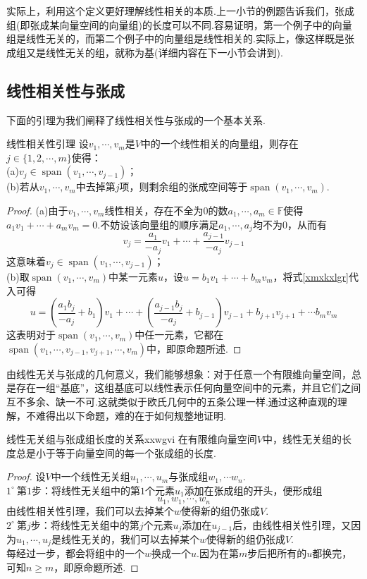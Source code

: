 \documentclass[lang=cn, zihao=5]{elegantbook}
\newcommand{\ssb}[1]{\left( #1 \right)}
\newcommand{\F}{\mathbb{F}}
\newcommand{\buzhou}[1]{$#1^{\circ} \ $}
\DeclareMathOperator{\spn}{span}
\begin{document}
实际上，利用这个定义更好理解线性相关的本质.上一小节的例题告诉我们，张成组(即张成某向量空间的向量组)的长度可以不同.容易证明，第一个例子中的向量组是线性无关的，而第二个例子中的向量组是线性相关的.实际上，像这样既是张成组又是线性无关的组，就称为基(详细内容在下一小节会讲到).


\subsection{线性相关性与张成}

下面的引理为我们阐释了线性相关性与张成的一个基本关系.

\begin{proposition}{线性相关性引理}
	设$v_1, \cdots ,v_m$是$V$中的一个线性相关的向量组，则存在$j \in \{ 1,2, \cdots ,m \}$使得： \\
	(a)$v_j \in \spn (v_1, \cdots , v_{j-1})$； \\
	(b)若从$v_1, \cdots ,v_m$中去掉第$j$项，则剩余组的张成空间等于$\spn (v_1, \cdots ,v_m)$.
\end{proposition}
\begin{proof}
	(a)由于$v_1, \cdots ,v_m$线性相关，存在不全为$0$的数$a_1, \cdots ,a_m \in \F$使得$a_1v_1 + \cdots + a_mv_m = 0$.不妨设该向量组的顺序满足$a_1, \cdots ,a_j$均不为$0$，从而有
	\begin{equation}
		v_j = \frac{a_1}{-a_j} v_1 + \cdots + \frac{a_{j-1}}{-a_j} v_{j-1} \label{xmxkxlgr}
	\end{equation}
	这意味着$v_j \in \spn (v_1, \cdots , v_{j-1})$； \\
	(b)取$\spn (v_1, \cdots ,v_m)$中某一元素$u$，设$u=b_1v_1 + \cdots + b_mv_m$，将式\ref{xmxkxlgr}代入可得
	$$u = \ssb{\frac{a_1b_j}{-a_j}+b_1}v_1 + \cdots + \ssb{\frac{a_{j-1}b_j}{-a_j}+b_{j-1}}v_{j-1} + b_{j+1} v_{j+1} + \cdots b_mv_m$$
	这表明对于$\spn (v_1, \cdots ,v_m)$中任一元素，它都在$\spn (v_1, \cdots ,v_{j-1} , v_{j+1}, \cdots ,v_m)$中，即原命题所述.
\end{proof}

由线性无关与张成的几何意义，我们能够想象：对于任意一个有限维向量空间，总是存在一组“基底”，这组基底可以线性表示任何向量空间中的元素，并且它们之间互不多余、缺一不可.这就类似于欧氏几何中的五条公理一样.通过这种直观的理解，不难得出以下命题，难的在于如何规整地证明.

\begin{proposition}{线性无关组与张成组长度的关系}{xxwgvi}
	在有限维向量空间$V$中，线性无关组的长度总是小于等于向量空间的每一个张成组的长度.
\end{proposition}
\begin{proof}
	设$V$中一个线性无关组$u_1, \cdots ,u_m$与张成组$w_1, \cdots w_n$. \\
	\buzhou{1}第$1$步：将线性无关组中的第$1$个元素$u_1$添加在张成组的开头，便形成组$$u_1,w_1, \cdots ,w_n$$
	由线性相关性引理，我们可以去掉某个$w$使得新的组仍张成$V$. \\
	\buzhou{2}第$j$步：将线性无关组中的第$j$个元素$u_j$添加在$u_{j-1}$后，由线性相关性引理，又因为$u_1, \cdots ,u_j$是线性无关的，我们可以去掉某个$w$使得新的组仍张成$V$. \\
	每经过一步，都会将组中的一个$w$换成一个$u$.因为在第$m$步后把所有的$u$都换完，可知$n \geq m$，即原命题所述.
\end{proof}
\end{document}
